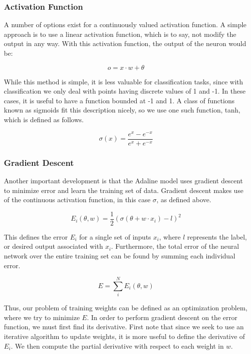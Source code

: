 \documentclass[a4paper, 11pt]{article} %
\begin{document}
\subsubsection*{Activation Function}
A number of options exist for a continuously valued activation function.  A simple approach is to use a linear activation function, which is to say, not modify the output in any way.  With this activation function, the output of the neuron would be:

\begin{equation}
o = x \cdot w + \theta
\end{equation}

While this method is simple, it is less valuable for classification tasks, since with classification we only deal with points having discrete values of 1 and -1.  In these cases, it is useful to have a function bounded at -1 and 1.  A class of functions known as sigmoids fit this description nicely, so we use one such function, tanh, which is defined as follows.

\begin{equation}
\sigma (x) = \frac{e^x - e^{-x}}{e^x + e^{-x}}
\end{equation}

\subsubsection*{Gradient Descent}

Another important development is that the Adaline model uses gradient descent to minimize error and learn the training set of data.  Gradient descent makes use of the continuous activation function, in this case  $\sigma$, as defined above.

\begin{equation}
E_i(\theta ,w) = \frac{1}{2}(\sigma (\theta + w \cdot x_i) - l)^2
\end{equation}

This defines the error $E_i$ for a single set of inputs $x_i$, where $l$ represents the label, or desired output associated with $x_i$.  Furthermore, the total error of the neural network over the entire training set can be found by summing each individual error.

\begin{equation}
E = \sum_{i}^{N} E_i(\theta ,w)
\end{equation}

Thus, our problem of training weights can be defined as an optimization problem, where we try to minimize $E$.  In order to perform gradient descent on the error function, we must first find its derivative.  First note that since we seek to use an iterative algorithm to update weights, it is more useful to define the derivative of $E_i$.  We then compute the partial derivative with respect to each weight in $w$.
\end{document}
